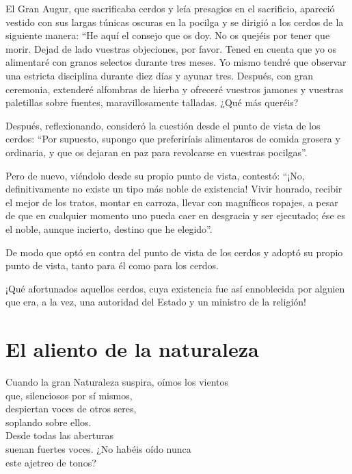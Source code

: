 \documentclass[book,b5paper,hidelinks,final]{memoir}
\begin{document}
	El Gran Augur, que sacrificaba cerdos y leía presagios en el sacrificio,
	apareció vestido con sus largas túnicas oscuras en la pocilga y se
	dirigió a los cerdos de la siguiente manera: ``He aquí el consejo que os
	doy. No os quejéis por tener que morir. Dejad de lado vuestras
	objeciones, por favor. Tened en cuenta que yo os alimentaré con granos
	selectos durante tres meses. Yo mismo tendré que observar una estricta
	disciplina durante diez días y ayunar tres. Después, con gran ceremonia,
	extenderé alfombras de hierba y ofreceré vuestros jamones y vuestras
	paletillas sobre fuentes, maravillosamente talladas. ¿Qué más queréis?
	
	Después, reflexionando, consideró la cuestión desde el punto de vista de
	los cerdos: ``Por supuesto, supongo que preferiríais alimentaros de
	comida grosera y ordinaria, y que os dejaran en paz para revolcarse en
	vuestras pocilgas''.
	
	Pero de nuevo, viéndolo desde su propio punto de vista, contestó: ``¡No,
	definitivamente no existe un tipo más noble de existencia! Vivir
	honrado, recibir el mejor de los tratos, montar en carroza, llevar con
	magníficos ropajes, a pesar de que en cualquier momento uno pueda caer
	en desgracia y ser ejecutado; ése es el noble, aunque incierto, destino
	que he elegido''.
	
	De modo que optó en contra del punto de vista de los cerdos y adoptó su
	propio punto de vista, tanto para él como para los cerdos.
	
	¡Qué afortunados aquellos cerdos, cuya existencia fue así ennoblecida
	por alguien que era, a la vez, una autoridad del Estado y un ministro de
	la religión!
	
	\chapter*{El aliento de la naturaleza}
	
	Cuando la gran Naturaleza suspira, oímos los vientos\\
	que, silenciosos por sí mismos,\\
	despiertan voces de otros seres,\\
	soplando sobre ellos.\\
	Desde todas las aberturas\\
	suenan fuertes voces. ¿No habéis oído nunca\\
	este ajetreo de tonos?
	
\end{document}
